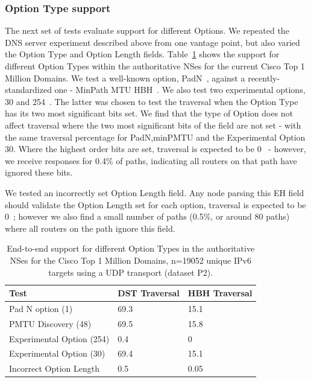 \documentclass[conference]{IEEEtran}
\begin{document}
\subsubsection{Option Type support}

The next set of tests evaluate support for different Options. We repeated the DNS server experiment described above from one vantage point, but also varied the Option Type and Option Length fields. 
Table~\ref{tbl:option_type_support} shows the support for different Option Types within the authoritative NSes for the current Cisco Top 1 Million Domains. We test a well-known option, PadN~\cite{rfc2460}, against a recently-standardized one - MinPath MTU HBH~\cite{rfc9268}. We also test two experimental options, 30 and 254~\cite{RFC4727}. The latter was chosen to test the traversal when the Option Type has its two most significant bits set.
We find that the type of Option  does not affect traversal where the two most significant bits of the field are not set - with the same traversal percentage for PadN,minPMTU and the Experimental Option 30. Where the highest order bits are set, traversal is expected to be 0~\cite{RFC8200} - however, we  receive responses for 0.4\% of paths, indicating all routers on that path have ignored these bits.

We tested an incorrectly set Option Length field. Any node parsing this EH field should validate the Option Length set for each option, traversal is expected to be 0~\cite{RFC8200}; however we also find a small number of paths (0.5\%, or around 80 paths) where all routers on the path ignore this field.

\begin{table}
\begin{tabular}{l|l|l}
Test                      & DST Traversal & HBH Traversal\\
\hline
Pad N option (1)          & 69.3           & 15.1          \\
PMTU Discovery (48)       & 69.5           & 15.8          \\
Experimental Option (254) & 0.4            & 0             \\
Experimental Option (30)  & 69.4           & 15.1          \\
Incorrect Option Length   & 0.5            & 0.05            
\end{tabular}
\label{tbl:option_type_support}
\caption{End-to-end support for different Option Types in the authoritative NSes for the Cisco Top 1 Million Domains, n=19052 unique IPv6 targets using a UDP transport (dataset P2).}
\end{table}
\end{document}
